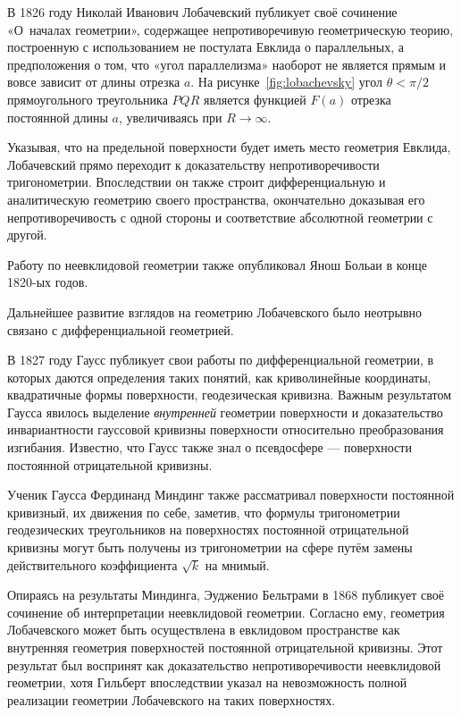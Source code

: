\documentclass{article}
\numberwithin{equation}{section}
\begin{document}
В 1826 году Николай Иванович Лобачевский публикует своё сочинение
«О началах геометрии», содержащее непротиворечивую геометрическую
теорию, построенную с использованием не постулата Евклида о
параллельных, а предположения о том, что «угол параллелизма» наоборот
не является прямым и вовсе зависит от длины отрезка $a$. На
рисунке \ref{fig:lobachevsky} угол $\theta < \pi/2$ прямоугольного
треугольника $PQR$ является функцией $F(a)$ отрезка постоянной длины
$a$, увеличиваясь при $R \to \infty$.



Указывая, что на предельной поверхности будет иметь место геометрия
Евклида, Лобачевский прямо переходит к доказательству
непротиворечивости тригонометрии. Впоследствии он также строит
дифференциальную и аналитическую геометрию своего пространства,
окончательно доказывая его непротиворечивость с одной стороны и
соответствие абсолютной геометрии с другой.

Работу по неевклидовой геометрии также опубликовал Янош Больаи в конце
1820-ых годов.

Дальнейшее развитие взглядов на геометрию Лобачевского было неотрывно
связано с дифференциальной геометрией.

В 1827 году Гаусс публикует свои работы по дифференциальной геометрии,
в которых даются определения таких понятий, как криволинейные
координаты, квадратичные формы поверхности, геодезическая кривизна.
Важным результатом Гаусса явилось выделение \emph{внутренней}
геометрии поверхности и доказательство инвариантности гауссовой
кривизны поверхности относительно преобразования изгибания. Известно,
что Гаусс также знал о псевдосфере — поверхности постоянной
отрицательной кривизны.

Ученик Гаусса Фердинанд Миндинг также рассматривал поверхности
постоянной кривизный, их движения по себе, заметив, что формулы
тригонометрии геодезических треугольников на поверхностях постоянной
отрицательной кривизны могут быть получены из тригонометрии на сфере
путём замены действительного коэффициента $\sqrt{k}$ на мнимый.

Опираясь на результаты Миндинга, Эудженио Бельтрами в 1868 публикует
своё сочинение об интерпретации неевклидовой геометрии. Согласно ему,
геометрия Лобачевского может быть осуществлена в евклидовом
пространстве как внутренняя геометрия поверхностей постоянной
отрицательной кривизны. Этот результат был воспринят как
доказательство непротиворечивости неевклидовой геометрии, хотя
Гильберт впоследствии указал на невозможность полной реализации
геометрии Лобачевского на таких поверхностях.
\end{document}
